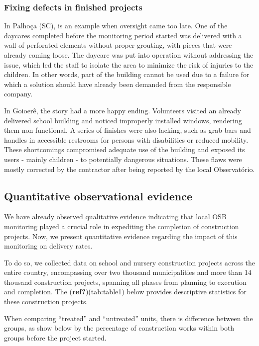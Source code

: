 \documentclass[]{AEA}
\begin{document}
\hypertarget{fixing-defects-in-finished-projects}{%
\subsubsection{Fixing defects in finished
projects}\label{fixing-defects-in-finished-projects}}

In Palhoça (SC), is an example when oversight came too late. One of the
daycares completed before the monitoring period started was delivered
with a wall of perforated elements without proper grouting, with pieces
that were already coming loose. The daycare was put into operation
without addressing the issue, which led the staff to isolate the area to
minimize the risk of injuries to the children. In other words, part of
the building cannot be used due to a failure for which a solution should
have already been demanded from the responsible company.

In Goioerê, the story had a more happy ending. Volunteers visited an
already delivered school building and noticed improperly installed
windows, rendering them non-functional. A series of finishes were also
lacking, such as grab bars and handles in accessible restrooms for
persons with disabilities or reduced mobility. These shortcomings
compromised adequate use of the building and exposed its users - mainly
children - to potentially dangerous situations. These flaws were mostly
corrected by the contractor after being reported by the local
Observatório.

\hypertarget{quantitative-observational-evidence}{%
\subsection{Quantitative observational
evidence}\label{quantitative-observational-evidence}}

We have already observed qualitative evidence indicating that local OSB
monitoring played a crucial role in expediting the completion of
construction projects. Now, we present quantitative evidence regarding
the impact of this monitoring on delivery rates.

To do so, we collected data on school and nursery construction projects
across the entire country, encompassing over two thousand municipalities
and more than 14 thousand construction projects, spanning all phases
from planning to execution and completion. The
(\textbf{ref?})(tab:table1) below provides descriptive statistics for
these construction projects.

When comparing ``treated'' and ``untreated'' units, there is difference
between the groups, as show below by the percentage of construction
works within both groups before the project started.
\end{document}
